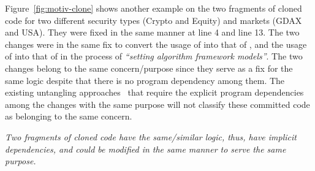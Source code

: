 Figure~\ref{fig:motiv-clone} shows another example on the two
fragments of cloned code for two different security types (Crypto and
Equity) and markets (GDAX and USA). They were fixed in the same manner
at line 4 and line 13. The two changes were in the same fix to convert
the usage of  into that of
, and the usage of
 into that of
 in the process of {\em ``setting
  algorithm framework models''}. The two changes belong to the same
concern/purpose since they serve as a fix for the same logic despite
that there is no program dependency among them. The existing
untangling
approaches~\cite{flexeme-fse20,smartcommit-fse21,roover-scam18,barnett-icse15}
that require the explicit program dependencies among the changes with
the same purpose will not classify these committed code as belonging
to the same concern.

 {\em Two
  fragments of cloned code have the same/similar logic, thus, have
  implicit dependencies, and could be modified in the same manner to
  serve the same purpose.}





